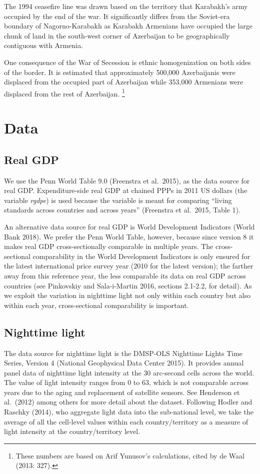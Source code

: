 \documentclass[12pt,a4paper]{article}%
\begin{document}
The 1994 ceasefire line was drawn based on the territory that Karabakh's army occupied by the end of the war. It significantly differs from the Soviet-era boundary of Nagorno-Karabakh as Karabakh Armenians have occupied the large chunk of land in the south-west corner of Azerbaijan to be geographically contiguous with Armenia.

One consequence of the War of Secession is ethnic homogenization on both sides of the border. It is estimated that approximately 500,000 Azerbaijanis were displaced from the occupied part of Azerbaijan while 353,000 Armenians were displaced from the rest of Azerbaijan.%
\footnote{
	These numbers are based on Arif Yunusov's calculations, cited by de Waal (2013: 327).
}
\section{Data}
\subsection{Real GDP}
We use the Penn World Table 9.0 (Freenstra et al.\ 2015), as the data source for real GDP. 
Expenditure-side real GDP at chained PPPs in 2011 US dollars (the variable \textit{rgdpe}) is used because the variable is meant for comparing ``living standards across countries and across years'' (Freenstra et al.\ 2015, Table 1).

An alternative data source for real GDP is World Development Indicators (World Bank 2018). 
We prefer the Penn World Table, however, because since version 8 it makes real GDP cross-sectionally comparable in multiple years. 
The cross-sectional comparability in the World Development Indicators is only ensured for the latest international price survey year (2010 for the latest version); the farther away from this reference year, the less comparable its data on real GDP across countries (see Pinkovskiy and Sala-i-Martin 2016, sections 2.1-2.2, for detail).
As we exploit the variation in nighttime light not only within each country but also within each year, cross-sectional comparability is important.

\subsection{Nighttime light}
The data source for nighttime light is the DMSP-OLS Nighttime Lights Time Series, Version 4 (National Geophysical Data Center 2015). 
It provides annual panel data of nighttime light intensity at the 30 arc-second cells across the world. 
The value of light intensity ranges from 0 to 63, which is not comparable across years due to the aging and replacement of satellite sensors. 
See Henderson et al.\ (2012) among others for more detail about the dataset.
Following Hodler and Raschky (2014), who aggregate light data into the sub-national level, we take the average of all the cell-level values within each country/territory as a measure of light intensity at the country/territory level.
\end{document}
